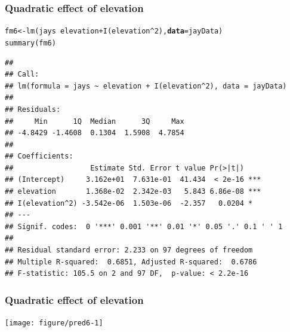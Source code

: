 \documentclass[color=usenames,dvipsnames]{beamer}\usepackage[]{graphicx}\usepackage[]{color}
\makeatletter
\newcommand{\hlnum}[1]{\textcolor[rgb]{0.69,0.494,0}{#1}}%
\newcommand{\hlopt}[1]{\textcolor[rgb]{0,0,0}{#1}}%
\newcommand{\hlstd}[1]{\textcolor[rgb]{0,0,0}{#1}}%
\newcommand{\hlkwb}[1]{\textcolor[rgb]{0,0.341,0.682}{#1}}%
\newcommand{\hlkwc}[1]{\textcolor[rgb]{0,0,0}{\textbf{#1}}}%
\newcommand{\hlkwd}[1]{\textcolor[rgb]{0.004,0.004,0.506}{#1}}%
\newenvironment{kframe}{%
 \def\at@end@of@kframe{}%
 \ifinner\ifhmode%
  \def\at@end@of@kframe{\end{minipage}}%
  \begin{minipage}{\columnwidth}%
 \fi\fi%
 \def\FrameCommand##1{\hskip\@totalleftmargin \hskip-\fboxsep
 \colorbox{shadecolor}{##1}\hskip-\fboxsep
     \hskip-\linewidth \hskip-\@totalleftmargin \hskip\columnwidth}%
 \MakeFramed {\advance\hsize-\width
   \@totalleftmargin\z@ \linewidth\hsize
   \@setminipage}}%
 {\par\unskip\endMakeFramed%
 \at@end@of@kframe}
\newenvironment{knitrout}{}{} %
\makeatother
\begin{document}
\begin{frame}[fragile]
  \frametitle{Quadratic effect of elevation}
\begin{knitrout}\scriptsize
{}\color{fgcolor}\begin{kframe}
\begin{alltt}
\hlstd{fm6} \hlkwb{<-} \hlkwd{lm}\hlstd{(jays} \hlopt{~} \hlstd{elevation}\hlopt{+}\hlkwd{I}\hlstd{(elevation}\hlopt{^}\hlnum{2}\hlstd{),} \hlkwc{data}\hlstd{=jayData)}
\hlkwd{summary}\hlstd{(fm6)}
\end{alltt}
\begin{verbatim}
## 
## Call:
## lm(formula = jays ~ elevation + I(elevation^2), data = jayData)
## 
## Residuals:
##     Min      1Q  Median      3Q     Max 
## -4.8429 -1.4608  0.1304  1.5908  4.7854 
## 
## Coefficients:
##                  Estimate Std. Error t value Pr(>|t|)    
## (Intercept)     3.162e+01  7.631e-01  41.434  < 2e-16 ***
## elevation       1.368e-02  2.342e-03   5.843 6.86e-08 ***
## I(elevation^2) -3.542e-06  1.503e-06  -2.357   0.0204 *  
## ---
## Signif. codes:  0 '***' 0.001 '**' 0.01 '*' 0.05 '.' 0.1 ' ' 1
## 
## Residual standard error: 2.233 on 97 degrees of freedom
## Multiple R-squared:  0.6851,	Adjusted R-squared:  0.6786 
## F-statistic: 105.5 on 2 and 97 DF,  p-value: < 2.2e-16
\end{verbatim}
\end{kframe}
\end{knitrout}
\end{frame}




\begin{frame}[fragile]
  \frametitle{Quadratic effect of elevation}
\begin{knitrout}
\color{fgcolor}
\texttt{[image: figure/pred6-1]} 

\end{knitrout}
\end{frame}
\end{document}

